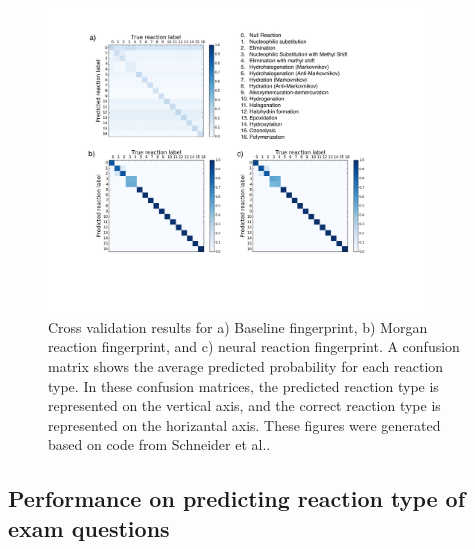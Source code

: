 \begin{figure}[ht!]
\begin{center}
\includegraphics[trim=80 180 80 70,clip,width=0.9\textwidth]{confmat}
\caption[Confusion Matrix for Reaction Prediction]{\label{fig:conf_mat} Cross validation results for a) Baseline fingerprint, b) Morgan reaction fingerprint, and c) neural reaction fingerprint. A confusion matrix shows the average predicted probability for each reaction type. In these confusion matrices, the predicted reaction type is represented on the vertical axis, and the correct reaction type is represented on the horizantal axis. These figures were generated based on code from Schneider et al.\cite{Schneider_2015}.
}
\end{center}
\end{figure}

\subsection{Performance on predicting reaction type of exam questions}

